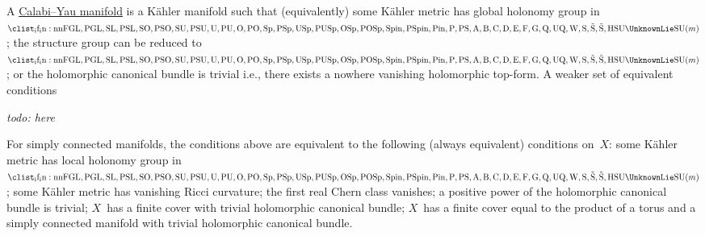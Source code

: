 \documentclass[10pt,letterpaper]{article}
\makeatletter
\newcommand{\ie}{i.e.\@}
\newcommand{\I}{\mathrm{i}}
\newcommand{\E}{\mathrm{e}}
\newcommand{\todo}[1]{\emph{todo: #1}}
\DeclareMathOperator{\diag}{diag}
\newcommand{\Lie}[1]{
  \mathrm {
    \clist_if_in:nnF
      { GL , PGL , SL , PSL , SO , PSO , SU , PSU , U , PU , O , PO , Sp , PSp , USp , PUSp , OSp , POSp , Spin , PSpin , Pin, P , PS , A , B , C , D , E , F , G , Q , UQ , W , S , \tilde S , \tilde{S} , H }
      {#1} { \UnknownLie }
    #1
  }
}
\newcommand{\lie}[1]{
  \mathfrak {
    \str_case:nnF {#1}
      {
        { gl } { gl }
        { sl } { sl }
        { so } { so }
        { su } { su }
        { u } { u }
        { o } { o }
        { sp } { sp }
        { usp } { usp }
        { osp } { osp }
        { A } { a }
        { B } { b }
        { C } { c }
        { D } { d }
        { E } { e }
        { F } { f }
        { G } { g }
        { P } { p }
        { Q } { q }
        { UQ } { uq }
        { W } { w }
        { S } { s }
        { \tilde S } { \tilde s }
        { \tilde{S} } { \tilde{s} }
        { H } { h }
        { T } { t }
        { g } { g }
      } { \ERROR #1 }
  }
}
\makeatother
\begin{document}
%

A \href{http://en.wikipedia.org/wiki/Calabi-Yau_manifold}{Calabi--Yau
  manifold} is a K\"ahler manifold such that (equivalently) some
K\"ahler metric has global holonomy group in $\Lie{SU}(m)$; the
structure group can be reduced to $\Lie{SU}(m)$; or the holomorphic
canonical bundle is trivial \ie, there exists a nowhere vanishing
holomorphic top-form.  A weaker set of equivalent conditions

\todo{here}

For simply connected manifolds, the conditions above are equivalent to
the following (always equivalent) conditions on~$X$: some K\"ahler
metric has local holonomy group in $\Lie{SU}(m)$; some K\"ahler metric
has vanishing Ricci curvature; the first real Chern class vanishes; a
positive power of the holomorphic canonical bundle is trivial; $X$~has a
finite cover with trivial holomorphic canonical bundle; $X$~has a finite
cover equal to the product of a torus and a simply connected manifold
with trivial holomorphic canonical bundle.







\end{document}
